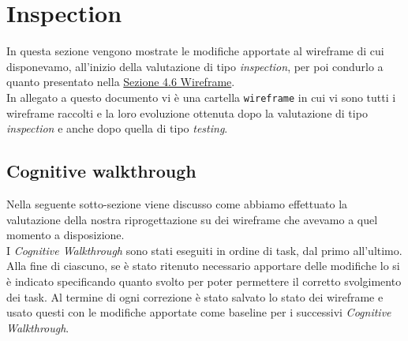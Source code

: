 \section{Inspection}
\label{s:inspection}

In questa sezione vengono mostrate le modifiche apportate al wireframe di cui disponevamo, all'inizio della valutazione di tipo \textit{inspection}, per poi condurlo a quanto presentato nella \hyperref[s:wireframe]{Sezione 4.6 Wireframe}.\\
In allegato a questo documento vi è una cartella \texttt{wireframe} in cui vi sono tutti i wireframe raccolti e la loro evoluzione ottenuta dopo la valutazione di tipo \textit{inspection} e anche dopo quella di tipo \textit{testing}.

\subsection{Cognitive walkthrough}
\label{ss:cognitive-walkthrough}

Nella seguente sotto-sezione viene discusso come abbiamo effettuato la valutazione della nostra riprogettazione su dei wireframe che avevamo a quel momento a disposizione.\\
I \textit{Cognitive Walkthrough} sono stati eseguiti in ordine di task, dal primo all'ultimo. Alla fine di ciascuno, se è stato ritenuto necessario apportare delle modifiche lo si è indicato specificando quanto svolto per poter permettere il corretto svolgimento dei task.
Al termine di ogni correzione è stato salvato lo stato dei wireframe e usato questi con le modifiche apportate come baseline per i successivi \textit{Cognitive Walkthrough}.\\








